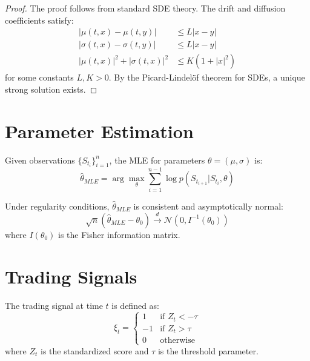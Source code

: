 \documentclass[12pt]{article}
\begin{document}
\begin{proof}
The proof follows from standard SDE theory. The drift and diffusion coefficients satisfy:
\begin{align}
|\mu(t,x) - \mu(t,y)| &\leq L|x-y| \\
|\sigma(t,x) - \sigma(t,y)| &\leq L|x-y| \\
|\mu(t,x)|^2 + |\sigma(t,x)|^2 &\leq K(1 + |x|^2)
\end{align}
for some constants $L, K > 0$. By the Picard-Lindelöf theorem for SDEs, a unique strong solution exists.
\end{proof}

\section{Parameter Estimation}

\begin{definition}
Given observations $\{S_{t_i}\}_{i=1}^n$, the MLE for parameters $\theta = (\mu, \sigma)$ is:
\begin{equation}
\hat{\theta}_{MLE} = \arg\max_{\theta} \sum_{i=1}^{n-1} \log p(S_{t_{i+1}} | S_{t_i}, \theta)
\end{equation}
\end{definition}

\begin{proposition}
Under regularity conditions, $\hat{\theta}_{MLE}$ is consistent and asymptotically normal:
\begin{equation}
\sqrt{n}(\hat{\theta}_{MLE} - \theta_0) \xrightarrow{d} \mathcal{N}(0, I^{-1}(\theta_0))
\end{equation}
where $I(\theta_0)$ is the Fisher information matrix.
\end{proposition}

\section{Trading Signals}

\begin{definition}
The trading signal at time $t$ is defined as:
\begin{equation}
\xi_t = \begin{cases}
1 & \text{if } Z_t < -\tau \\
-1 & \text{if } Z_t > \tau \\
0 & \text{otherwise}
\end{cases}
\end{equation}
where $Z_t$ is the standardized score and $\tau$ is the threshold parameter.
\end{definition}
\end{document}
